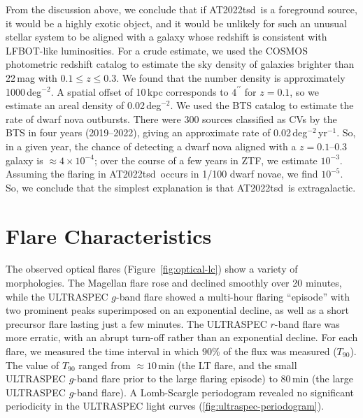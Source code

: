 \documentclass{nature_plusfigure}
\newcommand{\at}{AT2022tsd}
\begin{document}
\begin{methods}
From the discussion above, we conclude that if \at\ is a foreground source, it would be a highly exotic object, and it would be unlikely for such an unusual stellar system to be aligned with a galaxy whose redshift is consistent with LFBOT-like luminosities.
For a crude estimate, we used the COSMOS photometric redshift catalog\cite{Ilbert2008} to estimate the sky density of galaxies brighter than 22\,mag with $0.1 \leq z \leq 0.3$. We found that the number density is approximately 1000\,deg$^{-2}$.
A spatial offset of 10\,kpc corresponds to $4^{\prime\prime}$ for $z=0.1$, so we estimate an areal density of 0.02\,deg$^{-2}$.
We used the BTS catalog to estimate the rate of dwarf nova outbursts. There were 300 sources classified as CVs by the BTS in four years (2019--2022), giving an approximate rate of 0.02\,deg$^{-2}$\,yr$^{-1}$. So, in a given year, the chance of detecting a dwarf nova aligned with a $z=0.1$--0.3 galaxy is $\approx 4\times10^{-4}$; over the course of a few years in ZTF, we estimate $10^{-3}$. Assuming the flaring in \at\ occurs in 1/100 dwarf novae, we find $10^{-5}$.
So, we conclude that the simplest explanation is that \at\ is extragalactic.

\section{Flare Characteristics}
\label{sec:flare-characteristics}

The observed optical flares (Figure~\ref{fig:optical-lc}) show a variety of morphologies. The Magellan flare rose and declined smoothly over 20 minutes, while the ULTRASPEC $g$-band flare showed a multi-hour flaring ``episode'' with two prominent peaks superimposed on an exponential decline, as well as a short precursor flare lasting just a few minutes. The ULTRASPEC $r$-band flare was more erratic, with an abrupt turn-off rather than an exponential decline. For each flare, we measured the time interval in which 90\% of the flux was measured ($T_{90}$). The value of $T_{90}$ ranged from $\approx10$\,min (the LT flare, and the small ULTRASPEC $g$-band flare prior to the large flaring episode) to 80\,min (the large ULTRASPEC $g$-band flare). A Lomb-Scargle periodogram\cite{Lomb1976,Scargle1982} revealed no significant periodicity in the ULTRASPEC light curves (\ref{fig:ultraspec-periodogram}).


\end{methods}
\end{document}

